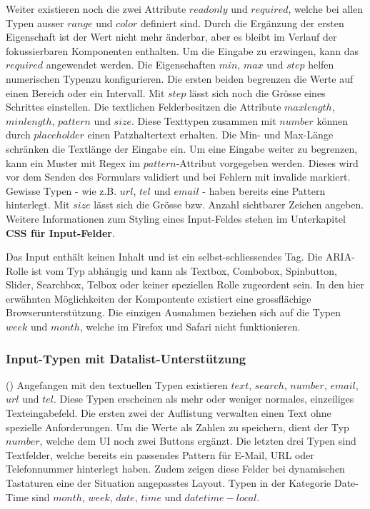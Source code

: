 Weiter existieren noch die zwei Attribute $readonly$ und $required$, welche bei allen Typen ausser $range$ und $color$ definiert sind.
Durch die Ergänzung der ersten Eigenschaft ist der Wert nicht mehr änderbar, aber es bleibt im Verlauf der fokussierbaren Komponenten enthalten.
Um die Eingabe zu erzwingen, kann das $required$ angewendet werden.
Die Eigenschaften $min$, $max$ und $step$ helfen numerischen Typen\footnotemark zu konfigurieren.
Die ersten beiden begrenzen die Werte auf einen Bereich oder ein Intervall.
Mit $step$ lässt sich noch die Grösse eines Schrittes einstellen.
Die textlichen Felder\footnotemark besitzen die Attribute $maxlength$, $minlength$, $pattern$ und $size$.
Diese Texttypen zusammen mit $number$ können durch $placeholder$ einen Patzhaltertext erhalten.
Die Min- und Max-Länge schränken die Textlänge der Eingabe ein.
Um eine Eingabe weiter zu begrenzen, kann ein Muster mit Regex im $pattern$-Attribut vorgegeben werden. %
Dieses wird vor dem Senden des Formulars validiert und bei Fehlern mit invalide markiert.
Gewisse Typen - wie z.B. $url$, $tel$ und $email$ - haben bereits eine Pattern hinterlegt.
Mit $size$ lässt sich die Grösse bzw. Anzahl sichtbarer Zeichen angeben.
Weitere Informationen zum Styling eines Input-Feldes stehen im Unterkapitel \textbf{CSS für Input-Felder}.

Das Input enthält keinen Inhalt und ist ein selbst-schliessendes Tag.
Die ARIA-Rolle ist vom Typ abhängig und kann als Textbox, Combobox, Spinbutton, Slider, Searchbox, Telbox oder keiner speziellen Rolle zugeordent sein.
In den hier erwähnten Möglichkeiten der Kompontente existiert eine grossflächige Browserunterstützung.
Die einzigen Ausnahmen beziehen sich auf die Typen $week$ und $month$, welche im Firefox und Safari nicht funktionieren.

\subsubsection{{\color{dgray} Input-Typen mit Datalist-Unterstützung}}
(\cite{datalistMdn}) Angefangen mit den textuellen Typen existieren $text$, $search$, $number$, $email$, $url$ und $tel$.
Diese Typen erscheinen als mehr oder weniger normales, einzeiliges Texteingabefeld.
Die ersten zwei der Auflistung verwalten einen Text ohne spezielle Anforderungen. 
Um die Werte als Zahlen zu speichern, dient der Typ $number$, welche dem UI noch zwei Buttons ergänzt.
Die letzten drei Typen sind Textfelder, welche bereits ein passendes Pattern für E-Mail, URL oder Telefonnummer hinterlegt haben.
Zudem zeigen diese Felder bei dynamischen Tastaturen eine der Situation angepasstes Layout\footnotemark.
Typen in der Kategorie Date-Time sind $month$, $week$, $date$, $time$ und $datetime-local$.

